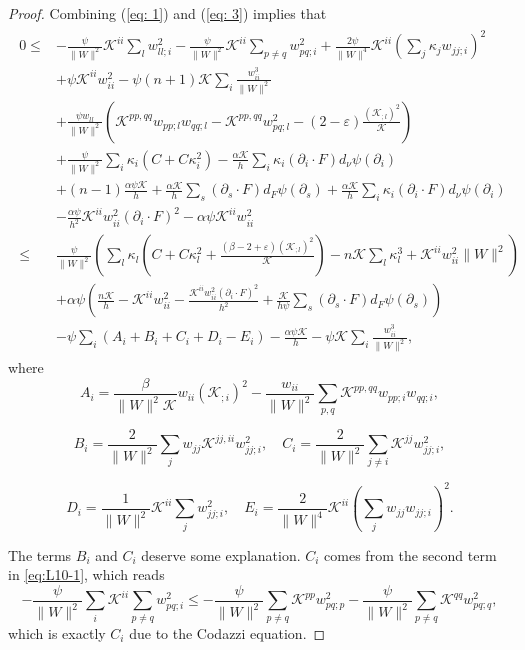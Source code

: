 \documentclass{amsart}
\theoremstyle{definition}
\theoremstyle{remark}
\numberwithin{equation}{section}
\begin{document}
\begin{proof}
Combining  (\ref{eq: 1}) and (\ref{eq: 3}) implies that
\begin{align}\begin{split}\label{eq:L10-1}
0\leq& -\frac{\psi}{\|W\|^2}\mathcal{K}^{ii}\sum_lw_{ll;i}^2-\frac{\psi}{\|W\|^2}\mathcal{K}^{ii}\sum_{p\ne q}w_{pq;i}^2
+\frac{2\psi}{\|W\|^4}\mathcal{K}^{ii}\left(\sum_j\kappa_jw_{jj;i}\right)^2\\
&+\psi\mathcal{K}^{ii}w_{ii}^2-\psi(n+1)\mathcal{K}\sum_i\frac{w_{ii}^3}{\|W\|^2}\\
&+\frac{\psi w_{ll}}{\|W\|^2}\left(\mathcal{K}^{pp,qq}w_{pp;l}w_{qq;l}-\mathcal{K}^{pp,qq}w_{pq;l}^2
-(2-\varepsilon)\frac{(\mathcal{K}_{;l})^2}{\mathcal{K}}\right)\\
&+\frac{\psi}{\|W\|^2}\sum_i \kappa_i(C+C\kappa_i^2)-\frac{\alpha\mathcal{K}}{h}\sum_i \kappa_i(\partial_i\cdot F) d_{\nu}\psi(\partial_i)\\
&+(n-1)\frac{\alpha\psi\mathcal{K}}{h}+\frac{\alpha\mathcal{K}}{h}\sum_s(\partial_s\cdot F) d_F\psi(\partial_s)+\frac{\alpha\mathcal{K}}{h}\sum_i\kappa_i(\partial_i\cdot F) d_{\nu}\psi(\partial_i)\\
&-\frac{\alpha\psi}{h^2}\mathcal{K}^{ii}w_{ii}^2(\partial_i\cdot F)^2 -\alpha\psi\mathcal{K}^{ii}w_{ii}^2\\
\leq&\frac{\psi}{\|W\|^2}\left(\sum_l\kappa_l\left(C+C\kappa_l^2+\frac{(\beta
-2+\varepsilon)(\mathcal{K}_{;l})^2}{\mathcal{K}}\right)-n\mathcal{K}\sum_l\kappa_l^3+\mathcal{K}^{ii}w_{ii}^2\|W\|^2\right)\\
&+\alpha\psi\left(\frac{n\mathcal{K}}{h}-\mathcal{K}^{ii}w_{ii}^2-\frac{\mathcal{K}^{ii}w_{ii}^2(\partial_i\cdot F)^2}{h^2}+\frac{\mathcal{K}}{h\psi}\sum_s(\partial_s\cdot F) d_F\psi(\partial_s)\right)\\
&-\psi\sum_i\left(A_i+B_i+C_i+D_i-E_i\right)
-\frac{\alpha\psi\mathcal{K}}{h}-\psi\mathcal{K}\sum_i\frac{w_{ii}^3}{\|W\|^2},
\end{split}\end{align}
where
\[A_i=\frac{\beta}{\|W\|^2\mathcal{K}} w_{ii}(\mathcal{K}_{;i})^2-\frac{w_{ii}}{\|W\|^2}\sum_{p,q}\mathcal{K}^{pp,qq}w_{pp;i}w_{qq;i},\]

\[B_i=\frac{2}{\|W\|^2}\sum_{j}w_{jj}\mathcal{K}^{jj,ii}w^2_{jj;i},\quad C_i=\frac{2}{\|W\|^2}\sum_{j\neq i}\mathcal{K}^{jj}w_{jj;i}^2,\]

\[D_i=\frac{1}{\|W\|^2}\mathcal{K}^{ii}\sum_j w_{jj;i}^2,\quad
E_i=\frac{2}{\|W\|^4}\mathcal{K}^{ii}\left(\sum_j w_{jj}w_{jj;i}\right)^2.\]

The terms $B_i$ and $C_i$ deserve some explanation. $C_i$ comes from the second term in \eqref{eq:L10-1}, which reads
\[-\frac{\psi}{\|W\|^2}\sum_i\mathcal{K}^{ii}\sum_{p\neq q}w_{pq;i}^2\leq -\frac{\psi}{\|W\|^2}\sum_{p\neq q}\mathcal{K}^{pp}w_{pq;p}^2-\frac{\psi}{\|W\|^2}\sum_{p\neq q}\mathcal{K}^{qq}w_{pq;q}^2, \]
which is exactly $C_i$ due to the Codazzi equation.


\end{proof}
\end{document}
